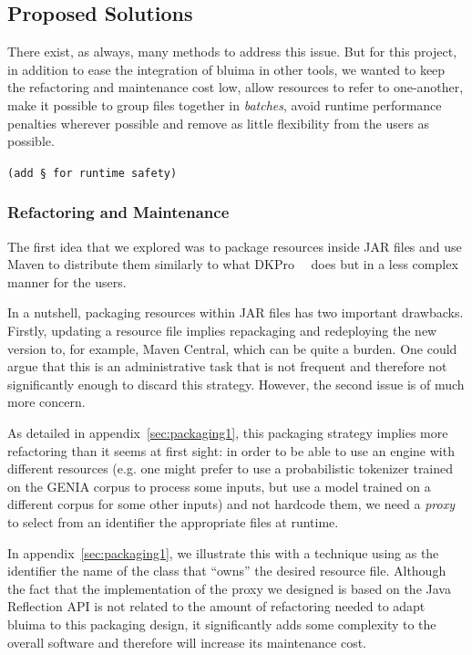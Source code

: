 \documentclass{article}
\newcommand{\JAR}{JAR\xspace}
\newcommand{\TODO}[1]{\texttt{\textcolor{YellowOrange}{(#1)}}} %
\begin{document}
\subsection{Proposed Solutions}

There exist, as always, many methods to address this issue. But for this project, in addition to
ease the integration of bluima in other tools, we wanted to keep the refactoring and maintenance
cost low, allow resources to refer to one-another, make it possible to group files together in
\emph{batches}, avoid runtime performance penalties wherever possible and remove as little
flexibility from the users as possible.

\TODO{add § for runtime safety}

\subsubsection{Refactoring and Maintenance}

The first idea that we explored was to package resources inside \JAR files and use Maven to
distribute them similarly to what DKPro~\cite{dkpro}~\cite{dkpro_2014} does but in a less complex
manner for the users.

In a nutshell, packaging resources within \JAR files has two important drawbacks. Firstly, updating
a resource file implies repackaging and redeploying the new version to, for example, Maven Central,
which can be quite a burden. One could argue that this is an administrative task that is not
frequent and therefore not significantly enough to discard this strategy. However, the second issue
is of much more concern.

As detailed in appendix~\ref{sec:packaging1}, this packaging strategy implies more refactoring than
it seems at first sight: in order to be able to use an engine with different resources (e.g. one
might prefer to use a probabilistic tokenizer trained on the GENIA corpus to process some inputs,
but use a model trained on a different corpus for some other inputs) and not hardcode them, we need
a \emph{proxy} to select from an identifier the appropriate files at runtime.

In appendix~\ref{sec:packaging1}, we illustrate this with a technique using as the identifier the
name of the class that ``owns'' the desired resource file. Although the fact that the implementation
of the proxy we designed is based on the Java Reflection API is not related to the amount of
refactoring needed to adapt bluima to this packaging design, it significantly adds some complexity
to the overall software and therefore will increase its maintenance cost.
\end{document}
